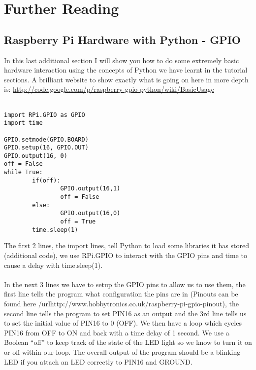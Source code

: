 \documentclass[twocolumn]{article}
\begin{document}
\section{Further Reading}

\subsection{Raspberry Pi Hardware with Python - GPIO}

In this last additional section I will show you how to do some extremely basic hardware interaction using the concepts of Python we have learnt in the tutorial sections. A brilliant website to show exactly what is going on here in more depth is: \url{http://code.google.com/p/raspberry-gpio-python/wiki/BasicUsage}\\
\\
\begin{lstlisting}
import RPi.GPIO as GPIO
import time

GPIO.setmode(GPIO.BOARD)
GPIO.setup(16, GPIO.OUT)
GPIO.output(16, 0)
off = False
while True:
        if(off):
                GPIO.output(16,1)
                off = False
        else:
                GPIO.output(16,0)
                off = True
        time.sleep(1)
\end{lstlisting}
The first 2 lines, the import lines, tell Python to load some libraries it has stored (additional code), we use RPi.GPIO to interact with the GPIO pins and time to cause a delay with time.sleep(1).\\
\\
In the next 3 lines we have to setup the GPIO pins to allow us to use them, the first line tells the program what configuration the pins are in (Pinouts can be found here /url{http://www.hobbytronics.co.uk/raspberry-pi-gpio-pinout}), the second line tells the program to set PIN16 as an output and the 3rd line tells us to set the initial value of PIN16 to 0 (OFF). We then have a loop which cycles PIN16 from OFF to ON and back with a time delay of 1 second. We use a Boolean ``off'' to keep track of the state of the LED light so we know to turn it on or off within our loop. The overall output of the program should be a blinking LED if you attach an LED correctly to PIN16 and GROUND.
\end{document}

